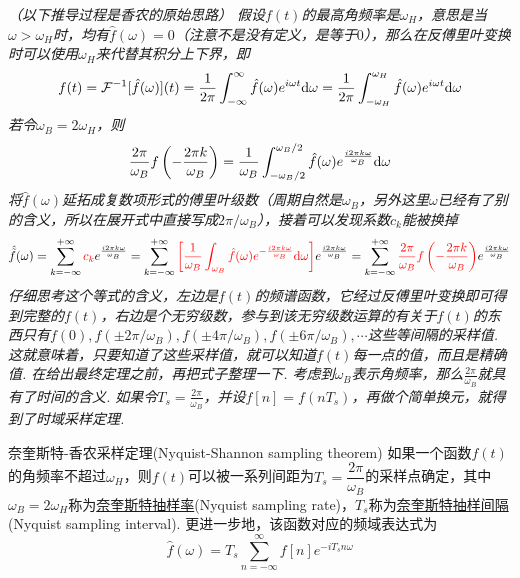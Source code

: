 \documentclass[main.tex]{subfiles}
\begin{document}
\textit{
\noindent（以下推导过程是香农的原始思路）
\newline
假设\(f(t)\)的最高角频率是\(\omega_H\)，意思是当\(\omega > \omega_H\)时，均有\(\hat{f}(\omega)=0\)（注意不是没有定义，是等于\(0\)），那么在反傅里叶变换时可以使用\(\omega_H\)来代替其积分上下界，即
\[f(t) = \mathcal{F}^{-1}[\hat{f}(\omega)](t) = \frac{1}{2\pi}\int_{-\infty}^{\infty}\hat{f}(\omega)e^{i\omega t}{\rm d}\omega = \frac{1}{2\pi}\int_{-\omega_H}^{\omega_H}\hat{f}(\omega)e^{i\omega t}{\rm d}\omega\]
若令\(\omega_B=2\omega_H\)，则
\[\frac{2\pi}{\omega_B}f\left(-\frac{2\pi k}{\omega_B}\right) = \frac{1}{\omega_B}\int_{-\omega_B/2}^{\omega_B/2}\hat{f}(\omega)e^{\frac{i2\pi k\omega}{\omega_B}}{\rm d}\omega\]
将\(\hat{f}(\omega)\)延拓成复数项形式的傅里叶级数（周期自然是\(\omega_B\)，另外这里\(\omega\)已经有了别的含义，所以在展开式中直接写成\(2\pi/\omega_B\)），接着可以发现系数\(c_k\)能被换掉
\[ \hat{\tilde{f}}(\omega) = \sum_{k=-\infty}^{+\infty}{\color{red} c_k}e^{\frac{i2\pi k\omega}{\omega_B}} 
= \sum_{k=-\infty}^{+\infty} {\color{red} \left[\frac{1}{\omega_B} \int_{\omega_B}\hat{f}(\omega)e^{-\frac{i2\pi k\omega}{\omega_B}}{\rm d}\omega\right]}e^{\frac{i2\pi k\omega}{\omega_B}} 
= \sum_{k=-\infty}^{+\infty} {\color{red} \frac{2\pi}{\omega_B}f\left(-\frac{2\pi k}{\omega_B}\right)}e^{\frac{i2\pi k\omega}{\omega_B}}\]
仔细思考这个等式的含义，左边是\(f(t)\)的频谱函数，它经过反傅里叶变换即可得到完整的\(f(t)\)，右边是个无穷级数，参与到该无穷级数运算的有关于\(f(t)\)的东西只有\(f(0), f(\pm 2\pi/\omega_B), f(\pm 4\pi/\omega_B), f(\pm 6\pi/\omega_B), \cdots\)这些等间隔的采样值. 这就意味着，只要知道了这些采样值，就可以知道\(f(t)\)每一点的值，而且是精确值.
\newline
在给出最终定理之前，再把式子整理一下. 考虑到\(\omega_B\)表示角频率，那么\(\displaystyle{\frac{2\pi}{\omega_B}}\)就具有了时间的含义. 如果令\(\displaystyle{T_s=\frac{2\pi}{\omega_B}}\)，并设\(\displaystyle{f[n]=f(nT_s)}\)，再做个简单换元，就得到了时域采样定理.
}

\begin{theorem}{奈奎斯特-香农采样定理(Nyquist-Shannon sampling theorem)}
    如果一个函数\(f(t)\)的角频率不超过\(\omega_H\)，则\(f(t)\)可以被一系列间距为\(T_s=\dfrac{2\pi}{\omega_B}\)的采样点确定，其中\(\omega_B=2\omega_H\)称为\uline{奈奎斯特抽样率}(Nyquist sampling rate)，\(T_s\)称为\uline{奈奎斯特抽样间隔}(Nyquist sampling interval). 更进一步地，该函数对应的频域表达式为
    \[\hat{f}(\omega) = T_s \sum_{n=-\infty}^{\infty}f[n]e^{-iT_sn\omega}\]
\end{theorem}
\end{document}

